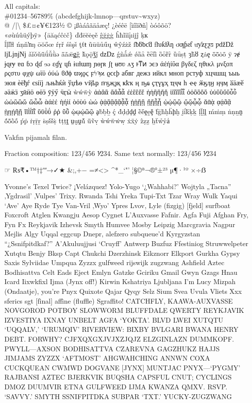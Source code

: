 \documentclass[a4paper,14pt]{memoir}
\begin{document}
{{
All capitals:\\
\#01234--56789\% (abcdefghijk-lmnop---qrstuv\textasciitilde{}wxyz)\\
@ /|\textbackslash{} \$£¤¢¥€123½
© ¡ßàáâãäåæç! ¿èéêë [ìíîïðñ] òóôõö?\\
«øùúûüýþÿ» \{āăąćĉċč\} ďđēĕėęě ĝğġģ ĥħĩīĭįıĳĵ ķĸ\\
ĺļľŀł ńņňŉŋ ōŏőœ ŕŗř śŝşš ţťŧ
ũūŭůűų ŵŷźżž ſƀƃƅƈƌ ƒƕƙƚƛƞ ơƣƥƨƭ ưƴƶƹƺƽ ƿǆǅ ǉǈǌǋ ǎǐǒǔǖǘǚǜǝ ǟǡǣǥǧ ǩǫǭǯǰ ǳǲ
ǵǹǻǽ ǿȁȃ ȅȇȉȋ ȍȏȑȓ ȕȗșț ȝȟȣ ȥȧȩ ȫȭȯȱ ȳ
ɂɇ ɉɋɍɏ ɐɑ ɓɔ ɖɗ ɘə
ɛɠɣ ɥɦ ɨɩɪɫɯɱ ɲɵɼʀ
ʃʈ ʉʊʋ ʌʒ
ͱͳͷ ͻͼͽ
άέήίΰα βγδεζ ηθικλ μνξοπ ρςστυ φχψ ωϊϋ
όύώ ϐϑϕ ϖϗϙϛ ϝϟϡϰ ϱϲϵϸ
абвг дежз ийкл мноп рстуф хцчшщ ъыь эюя
ѐёђѓ єѕіїј љњћќѝ ўџѣѳ ѵҋҍҏ ґғҕҗҙқ ҝҟҡ ң ҧҩ ҫҭүұҳ ҵҷҹ һ ҽҿ ӂӄӆӈ ӊӌӎ ӑӓӕӗ әӛӝӟ ӡӣӥӧ өӫӭ ӯӱӳ ӵӷӹ
ẁẃẅỳ
ἀἁἂἃ ἄἅἆἇ ἐἑἒἓἔἕ ἠἡἢἣἤἥ ἰἱἲἳἴἵἶἷ ὀὁὂὃὄὅ ὐὑὒὓὔὕὖὗ ὠὡὢὣὤ ὥὦὧ ὰάὲέ ὴήὶί ὸόὺύ ὼώ ᾀᾁᾂᾃᾄᾅᾆᾇ ᾐᾑᾒᾓ ᾔᾕᾖᾗ ᾠᾡᾢᾣ ᾤᾥᾦᾧ ᾰᾱᾲ ᾳᾴᾶᾷ
ῂῃῄῆῇ ῐῑῒΐῖῗ ῠῡῢΰ ῤῥ ῦῧ ῲῳῴῶῷ
ḁḃḅḇ ḉ ḋḍḏḑḓ ḕḗḙḛḝ ḟḡḣḥḧḩḫ ḭḯḱḳḵ ḷḹḻḽ ḿṁṃ ṅṇṉṋ ṍṏṑṓ ṕṗ ṙṛṝṟ ṡṣṥṧṩ ṫṭṯṱ ṳṵṷṹ ṻṽṿ ẁẃẅẇẉ ẋẍẏ ẑẓẕ ẖẗẘẙẚ

{Vakfın pijamalı filan.}
}

Fraction composition: {123/456 ⅟234}. Same text normally: 123/456 ⅟234

☞ ₨₹•™†‡ʹʺ→✓★ \&;,+− =≠<> \textasciicircum{}*\_`"'
¦§©ª¬®°±²³
µ¶·¹º ×÷ẞ

\newpage

Yvonne's Texel Twice? ¡Velázquez! Yolo-Yugo `¿Wahhabi?' Wojtyla „Tacna'' ‚Ygdrasil' ‚Vulpes' Trixy. Rwanda Tshi Yreka Tupi-Txt Tzar Wray Wulk Yaqui ‘Ave’ Aye Ryde Tye Van-Vril ‚Wyo' Ypres Lvov, Lyle (fizgig) [fjeld] surfboat Foxcroft Atglen Kwangju Aesop Cygnet L’Auxvasse Fafnir. Agfa Fuji Afghan Fry, Fyn Fx Reykjavik Izhevsk Smyth Humvee Mosby Leipzig Marcgravia Nagpur Mejlis Algy Uqqal eggcup Dnepr, alefzero subqueue'd Kyrgyzstan ``¿Ssnifpitdkaf?'' A’Akuluujjusi ‘Cruyff’ Antwerp Buzfuz Ffestiniog Struwwelpeter Xutqtu Benjy Bksp Capt Chukchi Dzerzhinsk Eikznorr Elkport {Gurkha} Gypsy Saxis Sylviidae Umpqua Zyzzx gulfweed rijswijk zugzwang Ashfield Aztec Bodhisattva Celt Eads Eject Emlyn Gatzke Gciriku Gmail Gwyn Gzags Hnau Icard Iixwkfixl Ijma (Jynx off!) Kirwin Kshatriya Ljubljana I'm Lucy Mizpah (Ondaatje), you're Pnyx Quixote Qajar Qyqy Selz Sium Svea Uvula Vliets Xxx sferics sgt [fìnal] affìne (fluffle) Sgraffito!
CATCHFLY, KAAWA-AUXVASSE NOVGOROD POTBOY SLOWWORM BLUFFDALE QWERTY REYKJAVIK IZVESTIYA IXNAY UNBELT AGFA ‘YOKTA’. BLVD LWEI XUTQTU ‘UQQALV,’ ‘URUMQIV’ RIVERVIEW: BIXBY BVLGARI BWANA HENRY DEBT. FORWHY? CJFXQXGXJVJXZJQJZ ELZGINLAZN DUMMKOPF. PWYLL—AXSON BODHISATTVA CZAREVNA GAGZHUKZ HAJJS JIMJAMS ZYZZX ‘AFTMOST’ AHGWAHCHING ANNWN COXA CUCKQUEAN CWMWD DOGVANE [JYNX] MUNTJAC PNYX—‘PYGMY’ RAJBANSI AZTEC BJERKVIK BUQSHA CAPSFUL CNUT; CYCLINGS DMOZ DUUMVIR ETNA GULFWEED IJMA KWANZA QMXV. RSVP. ‘SAVVY.’ SMYTH SSNIFPITDKA SUBPAR ‘TXT.’ YUCKY-ZUGZWANG

}
\end{document}
